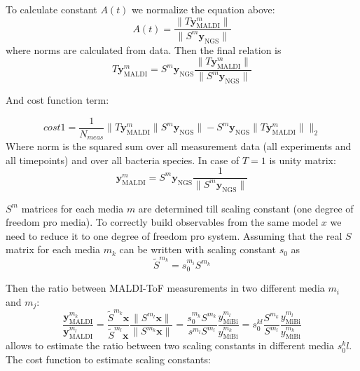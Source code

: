 \documentclass[10pt,A4paper]{article}
\begin{document}
To calculate constant $A(t)$ we normalize the equation above:
\begin{equation}
    A(t) = \frac{\lVert T \mathbf{y}^m_\text{MALDI} \rVert}{\lVert S^m \mathbf{y}_\text{NGS} \rVert}
\end{equation}
where norms are calculated from data.
Then the final relation is 
\begin{equation}
    T \mathbf{y}^m_\text{MALDI} = S^m \mathbf{y}_\text{NGS} \frac{\lVert T \mathbf{y}^m_\text{MALDI} \rVert}{\lVert S^m \mathbf{y}_\text{NGS} \rVert}
\end{equation}

And cost function term:

\begin{equation}\boxed{
    cost1 = \frac{1}{N_{meas}} \Big \lVert T \mathbf{y}^m_\text{MALDI} \lVert S^m \mathbf{y}_\text{NGS} \rVert -  S^m \mathbf{y}_\text{NGS} \lVert T \mathbf{y}^m_\text{MALDI} \rVert \Big \rVert _2}
\end{equation}
Where norm is the squared sum over all measurement data (all experiments and all timepoints) and over all bacteria species.
In case of $T = 1$ is unity matrix:
\begin{equation}
    \mathbf{y}^m_\text{MALDI} = S^m \mathbf{y}_\text{NGS} \frac{1}{\lVert S^m \mathbf{y}_\text{NGS} \rVert}
\end{equation}

$S^m$ matrices for each media $m$ are determined till scaling constant (one degree of freedom pro media).
To correctly build observables from the same model $x$ we need to reduce it to one degree of freedom pro system.
Assuming that the real $S$ matrix for each media $m_k$ can be written with scaling constant $s_0$ as
\begin{equation}
    \tilde S^{m_k} = s_0^{m_i} S^{m_k}
\end{equation}

Then the ratio between MALDI-ToF measurements in two different media $m_i$ and $m_j$:
\begin{equation}
    \frac{\mathbf{y}^{m_k}_\text{MALDI}}{\mathbf{y}^{m_l}_\text{MALDI}} = \frac{ \tilde S^{m_k} \mathbf{x}}{ \tilde S^{m_l} \mathbf{x}} \frac{\lVert S^{m_l} \mathbf{x} \rVert}{\lVert S^{m_k} \mathbf{x} \rVert} =
    \frac{s^{m_k}_0 S^{m_k} }{s^{m_l} S^{m_l}} \frac{y^{m_l}_\text{MiBi}}{y^{m_k}_\text{MiBi}} =
    s_0^{kl} \frac{S^{m_k} }{S^{m_l}} \frac{y^{m_l}_\text{MiBi}}{y^{m_k}_\text{MiBi}}
\end{equation}
allows to estimate the ratio between two scaling constants in different media $s_0^kl$.
The cost function to estimate scaling constants:
\end{document}
